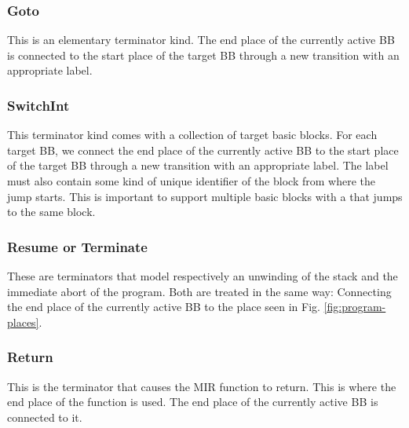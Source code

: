 \subsubsection{Goto}

This is an elementary terminator kind.
The end place of the currently active \acrshort{BB} is connected
to the start place of the target \acrshort{BB}
through a new transition with an appropriate label.

\subsubsection{SwitchInt}

This terminator kind comes with a collection of target basic blocks.
For each target \acrshort{BB},
we connect the end place of the currently active \acrshort{BB}
to the start place of the target \acrshort{BB}
through a new transition with an appropriate label.
The label must also contain some kind of unique identifier of the block from where the
jump starts.
This is important to support multiple basic blocks with a 
that jumps to the same block.

\subsubsection{Resume or Terminate}

These are terminators that model respectively an unwinding of the stack
and the immediate abort of the program.
Both are treated in the same way:
Connecting the end place of the currently active \acrshort{BB}
to the  place seen in Fig. \ref{fig:program-places}.

\subsubsection{Return}

This is the terminator that causes the \acrshort{MIR} function to return.
This is where the end place of the function is used.
The end place of the currently active \acrshort{BB} is connected to it.

